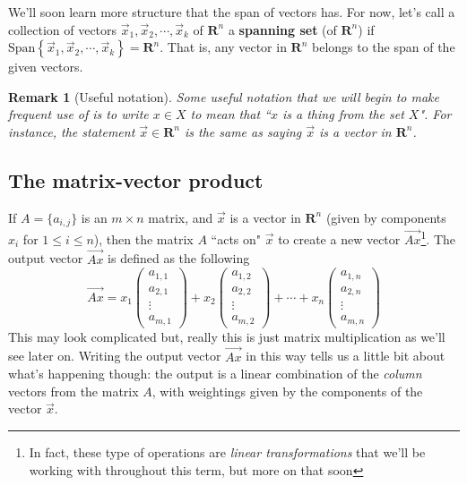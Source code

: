 \documentclass[12pt]{article}
\numberwithin{equation}{subsection}
\numberwithin{figure}{subsection}
\theoremstyle{note}
\newtheorem{remark}[subsection]{Remark}
\newcommand\Span[1]{\mathrm{Span}\left\{#1\right\}}
\begin{document}
We'll soon learn more structure that the span of vectors has. For now, let's call a collection of vectors  $\vec{x}_1, \vec{x}_2, \cdots , \vec{x}_k$ of $\mathbf{R}^n$ a \textbf{spanning set} (of $\mathbf{R}^n$) if $\Span{ \vec{x}_1, \vec{x}_2, \cdots , \vec{x}_k}=\mathbf{R}^n$. That is, any vector in $\mathbf{R}^n$ belongs to the span of the given vectors. 

\begin{remark}[Useful notation]
	Some useful notation that we will begin to make frequent use of is to write $x\in X$ to mean that ``$x$ is a thing from the set $X$". For instance, the statement $\vec{x}\in\mathbf{R}^n$ is the same as saying $\vec{x}$ is a vector in $\mathbf{R}^n$. 
\end{remark}



\subsection{The matrix-vector product} 
If $A=\{a_{i,j}\}$ is an $m\times n$ matrix, and $\vec{x}$ is a vector in $\mathbf{R}^n$ (given by components $x_i$ for $1\leq i \leq n$), then the matrix $A$ ``acts on" $\vec{x}$ to create a new vector $\vec{Ax}$\footnote{In fact, these type of operations are \textit{linear transformations} that we'll be working with throughout this term, but more on that soon}. The output vector $\vec{Ax}$ is defined as the following \begin{equation} \vec{Ax}= x_1 \begin{pmatrix} a_{1,1} \\ a_{2,1} \\ \vdots \\ a_{m, 1} \end{pmatrix} + x_2 \begin{pmatrix} a_{1,2} \\ a_{2,2} \\ \vdots \\ a_{m,2} \end{pmatrix} + \cdots + x_n \begin{pmatrix} a_{1,n} \\ a_{2,n} \\ \vdots \\ a_{m,n} \end{pmatrix} \end{equation}
This may look complicated but, really this is just matrix multiplication as we'll see later on. Writing the output vector $\vec{Ax}$ in this way tells us a little bit about what's happening though: the output is a linear combination of the \textit{column} vectors from the matrix $A$, with weightings given by the components of the vector $\vec{x}$. 
\end{document}
